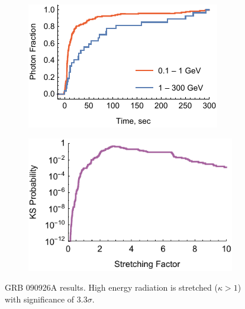 \documentclass{article}
\begin{document}
\begin{figure}
        \centering
        \begin{subfigure}{0.49\textwidth}
                \includegraphics[width=\textwidth]{lightCurve090926A}
                \label{fig:lightCurve090926A}
        \end{subfigure}
        \begin{subfigure}{0.49\textwidth}
                \includegraphics[width=\textwidth]{probabilities090926A}
                \label{fig:probabilities090926A}
        \end{subfigure}
        \caption{GRB 090926A results. High energy radiation is stretched ($\kappa > 1$) with significance of $3.3\sigma$.}
        \label{fig:grb090926A}
\end{figure}
\end{document}
